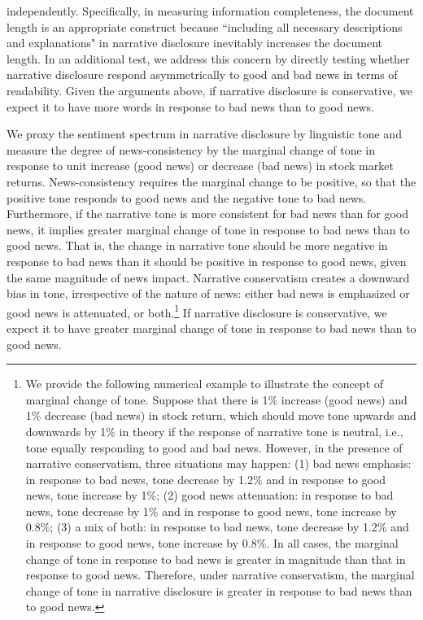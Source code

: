 \documentclass[letterpaper,11pt]{article}
\begin{document}
\begin{spacing}{1.5}
independently. Specifically, in measuring information completeness, the document length is an appropriate construct because ``including all necessary descriptions and explanations"  in narrative disclosure inevitably increases the document length. In an additional test, we address this concern by directly testing whether narrative disclosure respond asymmetrically to good and bad news in terms of readability. Given the arguments above, if narrative disclosure is conservative, we expect it to have more words in response to bad news than to good news.

We proxy the sentiment spectrum in narrative disclosure by linguistic tone and measure the degree of news-consistency by the marginal change of tone in response to unit increase (good news) or decrease (bad news) in stock market returns. News-consistency requires the marginal change to be positive, so that the positive tone responds to good news and the negative tone to bad news. Furthermore, if the narrative tone is more consistent for bad news than for good news, it implies greater marginal change of tone in response to bad news than to good news. That is, the change in narrative tone should be more negative in response to bad news than it should be positive in response to good news, given the same magnitude of news impact. Narrative conservatism creates a downward bias in tone, irrespective of the nature of news: either bad news is emphasized or good news is attenuated, or both.\footnote{We provide the following numerical example to illustrate the concept of marginal change of tone. Suppose that there is 1\% increase (good news) and 1\% decrease (bad news) in stock return, which should move tone upwards and downwards by 1\% in theory if the response of narrative tone is neutral, i.e., tone equally responding to good and bad news. However, in the presence of narrative conservatism, three situations may happen: (1) bad news emphasis: in response to bad news, tone decrease by 1.2\% and in response to good news, tone increase by 1\%; (2) good news attenuation: in response to bad news, tone decrease by 1\% and in response to good news, tone increase by 0.8\%; (3) a mix of both: in response to bad news, tone decrease by 1.2\% and in response to good news, tone increase by 0.8\%. In all cases, the marginal change of tone in response to bad news is greater in magnitude than that in response to good news. Therefore, under narrative conservatism, the marginal change of tone in narrative disclosure is greater in response to bad news than to good news.} If narrative disclosure is conservative, we expect it to have greater marginal change of tone in response to bad news than to good news.


\end{spacing}
\end{document}
